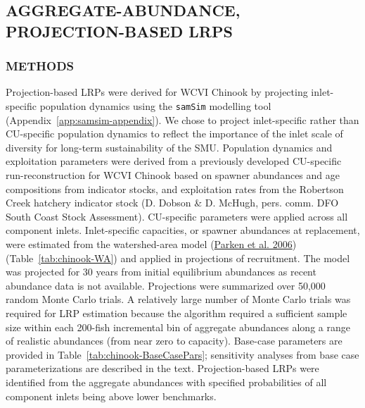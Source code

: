 \documentclass[11pt]{book}
\begin{document}
\hypertarget{aggregate-abundance-projection-based-lrps}{%
\subsection{AGGREGATE-ABUNDANCE, PROJECTION-BASED LRPS}\label{aggregate-abundance-projection-based-lrps}}

\hypertarget{methods-3}{%
\subsubsection{METHODS}\label{methods-3}}

Projection-based LRPs were derived for WCVI Chinook by projecting inlet-specific population dynamics using the \texttt{samSim} modelling tool (Appendix~\ref{app:samsim-appendix}). We chose to project inlet-specific rather than CU-specific population dynamics to reflect the importance of the inlet scale of diversity for long-term sustainability of the SMU. Population dynamics and exploitation parameters were derived from a previously developed CU-specific run-reconstruction for WCVI Chinook based on spawner abundances and age compositions from indicator stocks, and exploitation rates from the Robertson Creek hatchery indicator stock (D. Dobson \& D. McHugh, pers. comm. DFO South Coast Stock Assessment). CU-specific parameters were applied across all component inlets. Inlet-specific capacities, or spawner abundances at replacement, were estimated from the watershed-area model (\protect\hyperlink{ref-parkenHabitatbasedMethodsEstimate2006}{Parken et al. 2006}) (Table~\ref{tab:chinook-WA}) and applied in projections of recruitment. The model was projected for 30 years from initial equilibrium abundances as recent abundance data is not available. Projections were summarized over 50,000 random Monte Carlo trials. A relatively large number of Monte Carlo trials was required for LRP estimation because the algorithm required a sufficient sample size within each 200-fish incremental bin of aggregate abundances along a range of realistic abundances (from near zero to capacity). Base-case parameters are provided in Table~\ref{tab:chinook-BaseCasePars}; sensitivity analyses from base case parameterizations are described in the text. Projection-based LRPs were identified from the aggregate abundances with specified probabilities of all component inlets being above lower benchmarks.
\end{document}
